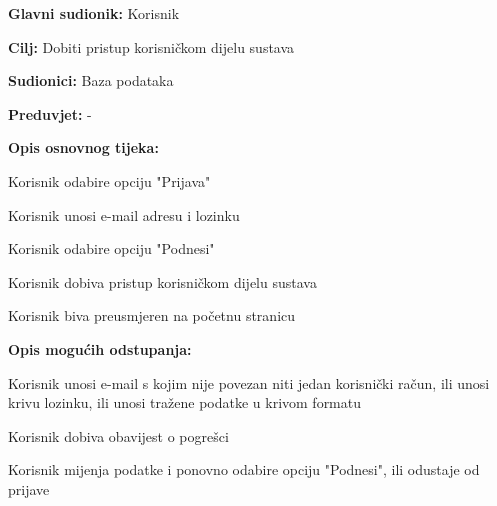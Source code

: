 					\noindent {}
					\begin{packed_item}
	
						\item \textbf{Glavni sudionik: }Korisnik
						\item  \textbf{Cilj:} Dobiti pristup korisničkom dijelu sustava
						\item  \textbf{Sudionici:} Baza podataka
						\item  \textbf{Preduvjet:} -
						\item  \textbf{Opis osnovnog tijeka:}
						
						\item[] \begin{packed_enum}
	
							\item Korisnik odabire opciju "Prijava"
							\item Korisnik unosi e-mail adresu i lozinku
							\item Korisnik odabire opciju "Podnesi"
							\item Korisnik dobiva pristup korisničkom dijelu sustava
							\item Korisnik biva preusmjeren na početnu stranicu
						\end{packed_enum}
						
						\item  \textbf{Opis mogućih odstupanja:}
						
						\item[] \begin{packed_item}
	
							\item[3.a] Korisnik unosi e-mail s kojim nije povezan niti jedan korisnički račun, ili unosi krivu lozinku, ili unosi tražene podatke u krivom formatu
							\item[] \begin{packed_enum}
								
								\item Korisnik dobiva obavijest o pogrešci
								\item Korisnik mijenja podatke i ponovno odabire opciju "Podnesi", ili odustaje od prijave
								
							\end{packed_enum}
							
						\end{packed_item}
					\end{packed_item}
					
